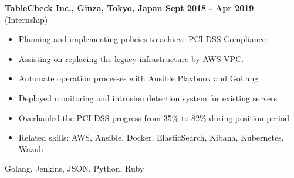 \textbf{TableCheck Inc., Ginza, Tokyo, Japan 
\hfill{Sept 2018 - Apr 2019}} \vspace{0.1cm} \\
 {(Internship)} \vspace{-0.3cm} \\
    \begin{itemize}
        \item Planning and implementing policies to achieve PCI DSS Compliance
        \item Assisting on replacing the legacy infrastructure by AWS VPC.
        \item Automate operation processes with Ansible Playbook and GoLang
        \item Deployed monitoring and intrusion detection system for existing servers
        \item Overhauled the PCI DSS progress from 35\% to 82\% during position period
        \item Related skills: AWS, Ansible, Docker, ElasticSearch, Kibana, Kubernetes, Wazuh
    \end{itemize}
        \vspace{-0.35cm}\qquad \qquad \qquad \qquad \quad 
        Golang, Jenkins, JSON, Python, Ruby

